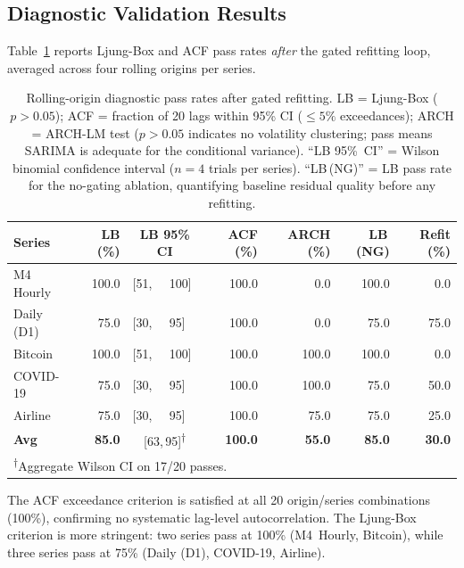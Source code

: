 \documentclass[sn-mathphys-num,pdflatex]{sn-jnl}
\begin{document}
\subsection{Diagnostic Validation Results}
\label{sec:diag_results}

Table~\ref{tab:diag} reports Ljung-Box and ACF pass rates
\emph{after} the gated refitting loop, averaged across four rolling
origins per series.

\begin{table}[ht]
\caption{Rolling-origin diagnostic pass rates after gated refitting.
LB = Ljung-Box ($p{>}0.05$); ACF = fraction of 20 lags within
95\% CI ($\leq5\%$ exceedances); ARCH = ARCH-LM test ($p{>}0.05$
indicates no volatility clustering; pass means SARIMA is adequate
for the conditional variance). ``LB 95\%~CI'' = Wilson binomial
confidence interval ($n{=}4$ trials per series).
``LB\,(NG)'' = LB pass rate for the no-gating ablation,
quantifying baseline residual quality before any refitting.}
\label{tab:diag}
\centering
\small
\setlength{\tabcolsep}{2pt}
\begin{tabular}{@{}lrll r r rr@{}}
\toprule
\textbf{Series}
& \textbf{LB (\%)} & \multicolumn{2}{c}{\textbf{LB 95\% CI}}
& \textbf{ACF (\%)} & \textbf{ARCH (\%)}
& \textbf{LB\,(NG)}
& \textbf{Refit (\%)} \\
\midrule
M4 Hourly & 100.0 & [51, & 100] & 100.0 & 0.0 & 100.0 & 0.0 \\
Daily (D1) & 75.0 & [30, & 95] & 100.0 & 0.0 & 75.0 & 75.0 \\
Bitcoin & 100.0 & [51, & 100] & 100.0 & 100.0 & 100.0 & 0.0 \\
COVID-19 & 75.0 & [30, & 95] & 100.0 & 100.0 & 75.0 & 50.0 \\
Airline & 75.0 & [30, & 95] & 100.0 & 75.0 & 75.0 & 25.0 \\
\midrule
\textbf{Avg} & \textbf{85.0} & \multicolumn{2}{c}{[63,\,95]\textsuperscript{$\dagger$}}
& \textbf{100.0} & \textbf{55.0} & \textbf{85.0} & \textbf{30.0} \\
\bottomrule
\multicolumn{8}{l}{\footnotesize\textsuperscript{$\dagger$}Aggregate Wilson CI on 17/20 passes.} \\
\end{tabular}
\end{table}

The ACF exceedance criterion is satisfied at all 20 origin/series
combinations (100\%), confirming no systematic lag-level autocorrelation.
The Ljung-Box criterion is more stringent: two series pass at 100\%
(M4~Hourly, Bitcoin), while three series pass at 75\%
(Daily (D1), COVID-19, Airline).
\end{document}
